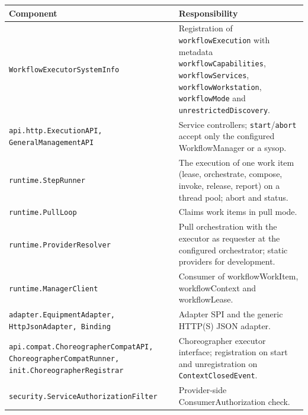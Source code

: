 \documentclass[a4paper]{arrowhead}
\begin{document}
{\small
\begin{longtable}{|p{6.2cm}|p{9.6cm}|}

\hline
\rowcolor{gray!33} Component & Responsibility \\ \hline
\endhead
{\footnotesize \texttt{WorkflowExecutorSystemInfo}} & Registration of \texttt{workflowExecution} with metadata \texttt{workflowCapabilities}, \texttt{workflowServices}, \texttt{workflowWorkstation}, \texttt{workflowMode} and \texttt{unrestrictedDiscovery}. \\ \hline
{\footnotesize \texttt{api.\allowbreak{}http.\allowbreak{}ExecutionAPI,\allowbreak{} GeneralManagementAPI}} & Service controllers; \texttt{start}/\texttt{abort} accept only the configured WorkflowManager or a sysop. \\ \hline
{\footnotesize \texttt{runtime.\allowbreak{}StepRunner}} & The execution of one work item (lease, orchestrate, compose, invoke, release, report) on a thread pool; abort and status. \\ \hline
{\footnotesize \texttt{runtime.\allowbreak{}PullLoop}} & Claims work items in pull mode. \\ \hline
{\footnotesize \texttt{runtime.\allowbreak{}ProviderResolver}} & Pull orchestration with the executor as requester at the configured orchestrator; static providers for development. \\ \hline
{\footnotesize \texttt{runtime.\allowbreak{}ManagerClient}} & Consumer of workflowWorkItem, workflowContext and workflowLease. \\ \hline
{\footnotesize \texttt{adapter.\allowbreak{}EquipmentAdapter,\allowbreak{} HttpJsonAdapter,\allowbreak{} Binding}} & Adapter SPI and the generic HTTP(S) JSON adapter. \\ \hline
{\footnotesize \texttt{api.\allowbreak{}compat.\allowbreak{}ChoreographerCompatAPI,\allowbreak{} ChoreographerCompatRunner,\allowbreak{} init.\allowbreak{}ChoreographerRegistrar}} & Choreographer executor interface; registration on start and unregistration on \texttt{ContextClosedEvent}. \\ \hline
{\footnotesize \texttt{security.\allowbreak{}ServiceAuthorizationFilter}} & Provider-side ConsumerAuthorization check. \\ \hline
\end{longtable}
}
\end{document}
